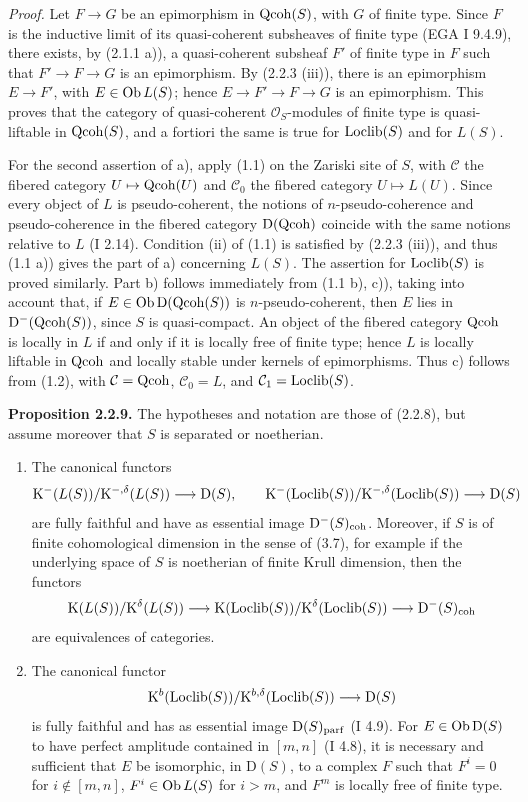 \documentclass[11pt]{article}
\begin{document}
\emph{Proof.} Let $F\to G$ be an epimorphism in $\operatorname{Qcoh}(S)$, with $G$ of finite type. Since $F$ is the inductive limit of its quasi-coherent subsheaves of finite type (EGA I 9.4.9), there exists, by (2.1.1 a)), a quasi-coherent subsheaf $F'$ of finite type in $F$ such that $F'\to F\to G$ is an epimorphism. By (2.2.3 (iii)), there is an epimorphism $E\to F'$, with $E\in\operatorname{Ob} L(S)$; hence $E\to F'\to F\to G$ is an epimorphism. This proves that the category of quasi-coherent $\mathcal O_S$-modules of finite type is quasi-liftable in $\operatorname{Qcoh}(S)$, and a fortiori the same is true for $\operatorname{Loclib}(S)$ and for $L(S)$.

For the second assertion of a), apply (1.1) on the Zariski site of $S$, with $\mathcal C$ the fibered category $U\mapsto\operatorname{Qcoh}(U)$ and $\mathcal C_0$ the fibered category $U\mapsto L(U)$. Since every object of $L$ is pseudo-coherent, the notions of $n$-pseudo-coherence and pseudo-coherence in the fibered category $\mathrm D(\operatorname{Qcoh})$ coincide with the same notions relative to $L$ (I 2.14). Condition (ii) of (1.1) is satisfied by (2.2.3 (iii)), and thus (1.1 a)) gives the part of a) concerning $L(S)$. The assertion for $\operatorname{Loclib}(S)$ is proved similarly. Part b) follows immediately from (1.1 b), c)), taking into account that, if $E\in\operatorname{Ob}\mathrm D(\operatorname{Qcoh}(S))$ is $n$-pseudo-coherent, then $E$ lies in $\mathrm D^{-}(\operatorname{Qcoh}(S))$, since $S$ is quasi-compact. An object of the fibered category $\operatorname{Qcoh}$ is locally in $L$ if and only if it is locally free of finite type; hence $L$ is locally liftable in $\operatorname{Qcoh}$ and locally stable under kernels of epimorphisms. Thus c) follows from (1.2), with $\mathcal C=\operatorname{Qcoh}$, $\mathcal C_0=L$, and $\mathcal C_1=\operatorname{Loclib}(S)$.

\textbf{Proposition 2.2.9.} The hypotheses and notation are those of (2.2.8), but assume moreover that $S$ is separated or noetherian.
\begin{enumerate}[label=\alph*)]
\item The canonical functors
\[
\mathrm K^{-}(L(S))/\mathrm K^{-,\delta}(L(S))\longrightarrow \mathrm D(S),
\qquad
\mathrm K^{-}(\operatorname{Loclib}(S))/\mathrm K^{-,\delta}(\operatorname{Loclib}(S))\longrightarrow \mathrm D(S)
\]
are fully faithful and have as essential image $\mathrm D^{-}(S)_{\mathrm{coh}}$. Moreover, if $S$ is of finite cohomological dimension in the sense of (3.7), for example if the underlying space of $S$ is noetherian of finite Krull dimension, then the functors
\[
\mathrm K(L(S))/\mathrm K^{\delta}(L(S))\longrightarrow
\mathrm K(\operatorname{Loclib}(S))/\mathrm K^{\delta}(\operatorname{Loclib}(S))\longrightarrow
\mathrm D^{-}(S)_{\mathrm{coh}}
\]
are equivalences of categories.
\item The canonical functor
\[
\mathrm K^b(\operatorname{Loclib}(S))/\mathrm K^{b,\delta}(\operatorname{Loclib}(S))\longrightarrow \mathrm D(S)
\]
is fully faithful and has as essential image $\mathrm D(S)_{\mathrm{parf}}$ (I 4.9). For $E\in\operatorname{Ob}\mathrm D(S)$ to have perfect amplitude contained in $[m,n]$ (I 4.8), it is necessary and sufficient that $E$ be isomorphic, in $\mathrm D(S)$, to a complex $F$ such that $F^i=0$ for $i\notin[m,n]$, $F^i\in\operatorname{Ob} L(S)$ for $i>m$, and $F^m$ is locally free of finite type.
\end{enumerate}
\end{document}
